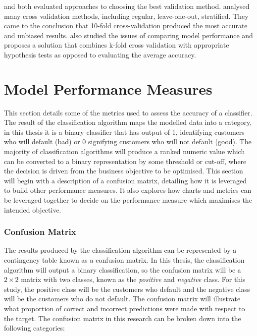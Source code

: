 \cite{kohavi_study_1995} and \cite{salzberg_comparing_1997} both evaluated approaches to choosing the best validation method. \cite{kohavi_study_1995} analysed many cross validation methods, including regular, leave-one-out, stratified. They came to the conclusion that 10-fold cross-validation produced the most accurate and unbiased results. \cite{salzberg_comparing_1997} also studied the issues of comparing model performance and proposes a solution that combines k-fold cross validation with appropriate hypothesis tests as opposed to evaluating the average accuracy.   

\section{Model Performance Measures}\label{modelPerformMeasure}

This section details some of the metrics used to assess the accuracy of a classifier. The result of the classification algorithm maps the modelled data into a category, in this thesis it is a binary classifier that has output of 1, identifying customers who will default (bad) or 0 signifying customers who will not default (good). The majority of classification algorithms will produce a ranked numeric value which can be converted to a binary representation by some threshold or cut-off, where the decision is driven from the business objective to be optimised. This section will begin with a description of a confusion matrix, detailing how it is leveraged to build other performance measures. It also explores how charts and metrics can be leveraged together to decide on the performance measure which maximises the intended objective.

\subsubsection{Confusion Matrix}

The results produced by the classification algorithm can be represented by a contingency table known as a confusion matrix. In this thesis, the classification algorithm will output a binary classification, so the confusion matrix will be a $2 \times 2$ matrix with two classes, known as the \textit{positive} and \textit{negative} class. For this study, the positive class will be the customers who default and the negative class will be the customers who do not default. The confusion matrix will illustrate what proportion of correct and incorrect predictions were made with respect to the target. The confusion matrix in this research can be broken down into the following categories:

